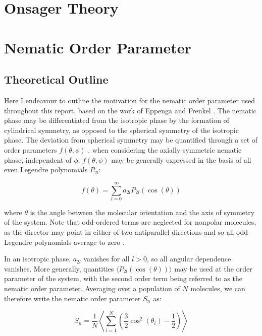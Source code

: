 \documentclass[11pt, a4paper]{article} %
\begin{document}
\printbibliography

\begin{appendices}

\section{Onsager Theory}
\section{Nematic Order Parameter} 
\subsection{Theoretical Outline}\label{sec:OrderParamTheory}
Here I endeavour to outline the motivation for the nematic order parameter used throughout this report, based on the work of Eppenga and Frenkel \cite{Eppenga1984, Frenkel1982}. The nematic phase may be differentiated from the isotropic phase by the formation of cylindrical symmetry, as opposed to the spherical symmetry of the isotropic phase. The deviation from spherical symmetry may be quantified through a set of order parameters $f(\theta, \phi)$ \cite{Zannoni1979}. when considering the axially symmetric nematic phase, independent of $\phi$, $f(\theta, \phi)$ may be generally expressed in the basis of all even Legendre polynomials $P_{2l}$:

\begin{equation}
f(\theta) = \sum_{l=0}^{\infty} a_{2l} P_{2l}(\cos(\theta))
\end{equation}

where $\theta$ is the angle between the molecular orientation and the axis of symmetry of the system. Note that odd-ordered terms are neglected for nonpolar molecules, as the director may point in either of two antiparallel directions and so all odd Legendre polynomials average to zero \cite{Parsons1979}.

In an isotropic phase, $a_{2l}$ vanishes for all $l>0$, so all angular dependence vanishes. More generally,  quantities $\langle P_{2l}(\cos(\theta)) \rangle$ may be used at the order parameter of the system, with the second order term being referred to as the nematic order parameter. Averaging over a population of $N$ molecules, we can therefore write the nematic order parameter $S_{n}$ as:

\begin{equation}
S_{n} = \frac{1}{N} \left\langle \sum_{i=1}^{N} \left( \frac{3}{2} \cos^{2}(\theta_{i})-\frac{1}{2} \right) \right\rangle
\end{equation}


\end{appendices}
\end{document}
